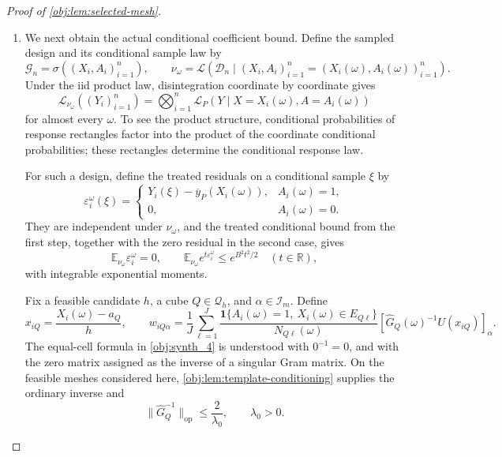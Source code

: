 \documentclass[11pt]{article}
\begin{document}
\begin{proof}[Proof of \cref{obj:lem:selected-mesh}]
\begin{enumerate}
\item We next obtain the actual conditional coefficient bound. Define
the sampled design and its conditional sample law by
\[
\mathcal G_n=\sigma((X_i,A_i)_{i=1}^n),
\qquad
\nu_\omega
=
\mathcal L\!\left(\mathcal D_n\mid
(X_i,A_i)_{i=1}^n=(X_i(\omega),A_i(\omega))_{i=1}^n\right).
\]
Under the iid product law, disintegration coordinate by coordinate gives
\[
\mathcal L_{\nu_\omega}((Y_i)_{i=1}^n)
=
\bigotimes_{i=1}^n
\mathcal L_P(Y\mid X=X_i(\omega),A=A_i(\omega))
\]
for almost every \(\omega\). To see the product structure, conditional
probabilities of response rectangles factor into the product of the
coordinate conditional probabilities; these rectangles determine the
conditional response law.

For such a design, define the treated residuals on a conditional sample
\(\xi\) by
\[
\varepsilon_i^\omega(\xi)
=
\begin{cases}
Y_i(\xi)-\overline y_P(X_i(\omega)),&A_i(\omega)=1,\\
0,&A_i(\omega)=0.
\end{cases}
\]
They are independent under \(\nu_\omega\), and the treated conditional
bound from the first step, together with the zero residual in the second
case, gives
\[
\mathbb E_{\nu_\omega}\varepsilon_i^\omega=0,\qquad
\mathbb E_{\nu_\omega}e^{t\varepsilon_i^\omega}
\le e^{B^2t^2/2}\quad(t\in\mathbb R),
\]
with integrable exponential moments.

Fix a feasible candidate \(h\), a cube \(Q\in\mathcal Q_h\), and
\(\alpha\in\mathcal I_m\). Define
\[
x_{iQ}=\frac{X_i(\omega)-a_Q}{h},
\qquad
w_{iQ\alpha}
=
\frac1J\sum_{\ell=1}^{J}
\frac{\mathbf1\{A_i(\omega)=1,\ X_i(\omega)\in E_{Q\ell}\}}
     {N_{Q\ell}(\omega)}
[\widehat G_Q(\omega)^{-1}U(x_{iQ})]_\alpha.
\]
The equal-cell formula in \cref{obj:synth_4} is understood with
\(0^{-1}=0\), and with the zero matrix assigned as the inverse of a
singular Gram matrix. On the feasible meshes considered here,
\cref{obj:lem:template-conditioning} supplies the ordinary inverse and
\[
\|\widehat G_Q^{-1}\|_{\mathrm{op}}\le\frac2{\lambda_0},
\qquad \lambda_0>0.
\]


\end{enumerate}
\end{proof}
\end{document}
